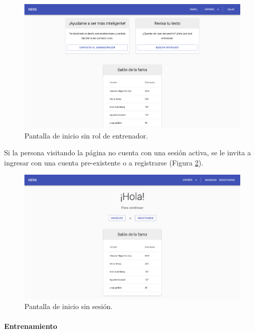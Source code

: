\documentclass[12pt,a4paper,]{scrartcl}
\let\oldparagraph\paragraph
\renewcommand{\paragraph}[1]{\oldparagraph{#1}\mbox{}}
\begin{document}
\begin{figure}[H]

{\centering \includegraphics{assets/logic/home-logged-not_trainer.pdf} 

}

\caption{Pantalla de inicio sin rol de entrenador.}\label{fig:logic-home-logged-nontrainer}
\end{figure}

Si la persona visitando la página no cuenta con una sesión activa, se le invita a ingresar con una cuenta pre-existente o a registrarse (Figura \ref{fig:logic-home-anonymous}).

\begin{figure}[H]

{\centering \includegraphics{assets/logic/home-anonymous.pdf} 

}

\caption{Pantalla de inicio sin sesión.}\label{fig:logic-home-anonymous}
\end{figure}

\hypertarget{entrenamiento}{%
\paragraph{Entrenamiento}\label{entrenamiento}}
\end{document}
